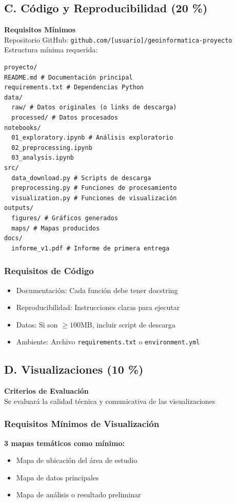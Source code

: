 \documentclass[11pt,a4paper]{article}
\begin{document}
\subsection{C. Código y Reproducibilidad (20 \%)}
\textbf{Requisitos Mínimos}\\
Repositorio GitHub: \texttt{github.com/[usuario]/geoinformatica-proyecto}\\
Estructura mínima requerida:

\begin{verbatim}
proyecto/
README.md # Documentación principal
requirements.txt # Dependencias Python
data/
  raw/ # Datos originales (o links de descarga)
  processed/ # Datos procesados
notebooks/
  01_exploratory.ipynb # Análisis exploratorio
  02_preprocessing.ipynb
  03_analysis.ipynb
src/
  data_download.py # Scripts de descarga
  preprocessing.py # Funciones de procesamiento
  visualization.py # Funciones de visualización
outputs/
  figures/ # Gráficos generados
  maps/ # Mapas producidos
docs/
  informe_v1.pdf # Informe de primera entrega
\end{verbatim}

\subsubsection{Requisitos de Código}
\begin{itemize}[leftmargin=1.2cm]
  \item Documentación: Cada función debe tener docstring
  \item Reproducibilidad: Instrucciones claras para ejecutar
  \item Datos: Si son $\ge 100$MB, incluir script de descarga
  \item Ambiente: Archivo \texttt{requirements.txt} o \texttt{environment.yml}
\end{itemize}

\subsection{D. Visualizaciones (10 \%)}
\textbf{Criterios de Evaluación}\\
Se evaluará la calidad técnica y comunicativa de las visualizaciones

\subsubsection{Requisitos Mínimos de Visualización}
\textbf{3 mapas temáticos como mínimo:}
\begin{itemize}[leftmargin=1.2cm]
  \item Mapa de ubicación del área de estudio
  \item Mapa de datos principales
  \item Mapa de análisis o resultado preliminar
\end{itemize}
\end{document}
